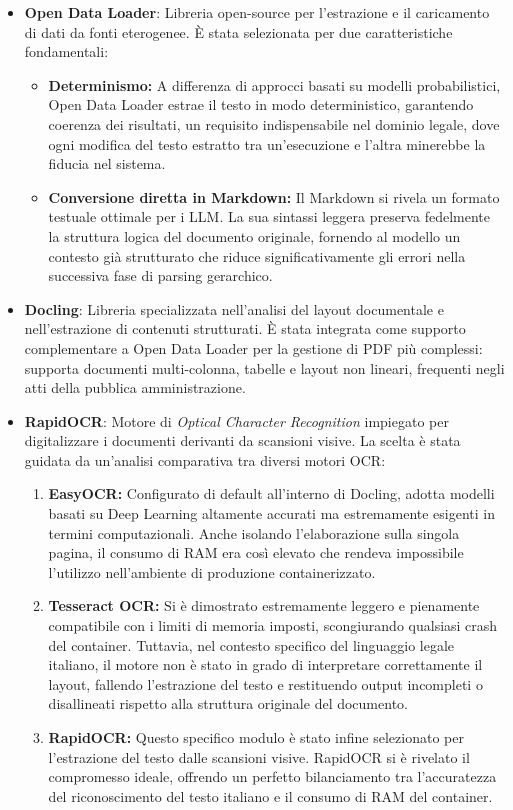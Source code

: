 \begin{itemize}
    \item \textbf{Open Data Loader}\cite{opendataloader}: Libreria open-source per l'estrazione e il caricamento di dati da fonti eterogenee. È stata selezionata per due caratteristiche fondamentali:
    \begin{itemize}
        \item \textbf{Determinismo:} A differenza di approcci basati su modelli probabilistici, Open Data Loader estrae il testo in modo deterministico, garantendo coerenza dei risultati, un requisito indispensabile nel dominio legale, dove ogni modifica del testo estratto tra un'esecuzione e l'altra minerebbe la fiducia nel sistema.
        \item \textbf{Conversione diretta in Markdown:} Il Markdown si rivela un formato testuale ottimale per i LLM. La sua sintassi leggera preserva fedelmente la struttura logica del documento originale, fornendo al modello un contesto già strutturato che riduce significativamente gli errori nella successiva fase di parsing gerarchico.
    \end{itemize}

    \item \textbf{Docling}\cite{docling}: Libreria specializzata nell'analisi del layout documentale e nell'estrazione di contenuti strutturati. È stata integrata come supporto complementare a Open Data Loader per la gestione di PDF più complessi: supporta documenti multi-colonna, tabelle e layout non lineari, frequenti negli atti della pubblica amministrazione.

    \item \textbf{RapidOCR}\cite{rapidocr}: Motore di \textit{Optical Character Recognition} impiegato per digitalizzare i documenti derivanti da scansioni visive. La scelta è stata guidata da un'analisi comparativa tra diversi motori OCR:
    \begin{enumerate}
        \item \textbf{EasyOCR:} Configurato di default all'interno di Docling, adotta modelli basati su Deep Learning altamente accurati ma estremamente esigenti in termini computazionali. Anche isolando l'elaborazione sulla singola pagina, il consumo di RAM era così elevato che rendeva impossibile l'utilizzo nell'ambiente di produzione containerizzato.
        \item \textbf{Tesseract OCR:} Si è dimostrato estremamente leggero e pienamente compatibile con i limiti di memoria imposti, scongiurando qualsiasi crash del container. Tuttavia, nel contesto specifico del linguaggio legale italiano, il motore non è stato in grado di interpretare correttamente il layout, fallendo l'estrazione del testo e restituendo output incompleti o disallineati rispetto alla struttura originale del documento.
        \item \textbf{RapidOCR:} Questo specifico modulo è stato infine selezionato per l'estrazione del testo dalle scansioni visive. RapidOCR si è rivelato il compromesso ideale, offrendo un perfetto bilanciamento tra l'accuratezza del riconoscimento del testo italiano e il consumo di RAM del container.
    \end{enumerate}
\end{itemize}

